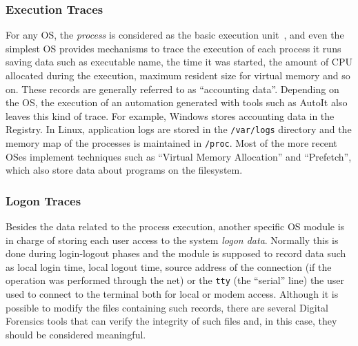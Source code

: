 \documentclass[runningheads]{llncs}
\begin{document}
\subsubsection{Execution Traces}
For any OS, the {\em process} is considered as the basic execution
unit~\cite{os}, and even the simplest OS provides mechanisms to trace the
execution of each process it runs saving data such as executable name, the time
it was started, the amount of CPU allocated during the execution, maximum resident size for virtual memory and so on. These records are generally referred to as ``accounting data''.
Depending on the OS, the execution of an automation generated with tools such as AutoIt also leaves this kind of trace. For example, Windows stores accounting data in the Registry. In Linux, application logs are stored in the \verb=/var/logs= directory and the memory map of the processes is maintained in \verb=/proc=. Most of the more recent OSes implement techniques such as ``Virtual Memory Allocation'' and ``Prefetch'', which also store data about programs on the filesystem.

\subsubsection{Logon Traces}
Besides the data related to the process execution, another specific OS module
is in charge of storing each user access to the system {\em logon data}.
Normally this is done during login-logout phases and the module is supposed to
record data such as local login time, local logout time, source address of the
connection (if the operation was performed through the net) or the \verb=tty= (the ``serial'' line) the user used to connect to the terminal both for local or modem access.
Although it is possible to modify the files containing such records, there are several Digital Forensics tools that can verify the integrity of such files and, in this case, they should be considered meaningful.
\end{document}
